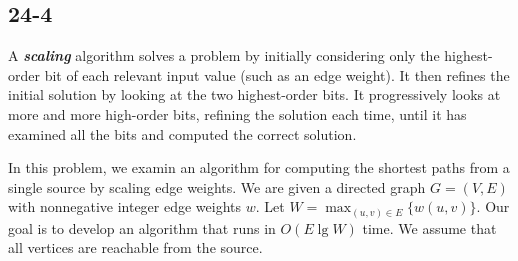 \documentclass{../../class}
\begin{document}
\subsection*{24-4}
A \textbf{\textit{scaling}} algorithm solves a problem by initially considering only the highest-order bit of each relevant input value (such as an edge weight). It then refines the initial solution by looking at the two highest-order bits. It progressively looks at more and more high-order bits, refining the solution each time, until it has examined all the bits and computed the correct solution.

In this problem, we examin an algorithm for computing the shortest paths from a single source by scaling edge weights. We are given a directed graph $G = (V, E)$ with nonnegative integer edge weights $w$. Let $W = \max_{(u, v)\in E}\{w(u, v)\}$. Our goal is to develop an algorithm that runs in $O(E\lg{W})$ time. We assume that all vertices are reachable from the source.
\end{document}
